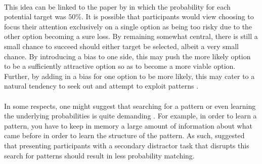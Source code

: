 \documentclass[12pt]{article}
\begin{document}
\paragraph{} This idea can be linked to the paper by \cite{clarke2015failure} in which the probability for each potential target was $50\%$. It is possible that participants would view choosing to focus their attention exclusively on a single option as being too risky due to the other option becoming a sure loss. By remaining somewhat central, there is still a small chance to succeed should either target be selected, albeit a very small chance. By introducing a bias to one side, this may push the more likely option to be a sufficiently attractive option so as to become a more viable option. Further, by adding in a bias for one option to be more likely, this may cater to a natural tendency to seek out and attempt to exploit patterns \citep{gaissmaier2008smart,yellott1969probability}.

\paragraph{} In some respects, one might suggest that searching for a pattern \citep{wolford2004searching} or even learning the underlying probabilities is quite demanding \citep{kahneman1982judgement}. For example, in order to learn a pattern, you have to keep in memory a large amount of information about what came before in order to learn the structure of the pattern. As such, \cite{wolford2004searching} suggested that presenting participants with a secondary distractor task that disrupts this search for patterns should result in less probability matching. %
\end{document}
